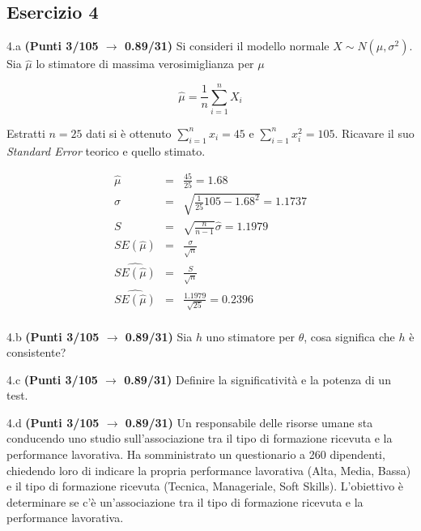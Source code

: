 \documentclass[
  11pt,
]{book}
\theoremstyle{mytheoremstyle}
\theoremstyle{mydefstyle}
\newenvironment{sol}
  {
  \begin{tcolorbox}[enhanced,breakable,arc=0.1mm,boxrule=1pt,colback=white,colframe=iblue,
  title=\bf \fontfamily{lmss}\selectfont \hspace{.5 cm} Soluzione,drop fuzzy shadow]

}{
\end{tcolorbox}
  }
\begin{document}
\subsection{Esercizio 4}\label{esercizio-4-39}

4.a \textbf{(Punti 3/105 \(\rightarrow\) 0.89/31)} Si consideri il modello normale \(X\sim N(\mu,\sigma^2)\). Sia \(\hat\mu\) lo stimatore di massima verosimiglianza per \(\mu\)

\[
  \hat\mu = \frac 1n \sum_{i=1}^n X_i
\]

Estratti \(n=25\) dati si è ottenuto \(\sum_{i=1}^n x_i = 45\) e \(\sum_{i=1}^n x_i^2 = 105\). Ricavare il suo \emph{Standard Error} teorico e quello stimato.

\begin{sol}
\begin{eqnarray*}
  \hat\mu  &=&\frac{45}{25}=1.68\\
  \hat\sigma &=&\sqrt{\frac 1{25}105-1.68^2}=1.1737\\
  S &=&\sqrt{\frac{n}{n-1}}\hat\sigma=1.1979\\
  SE(\hat\mu) &=&  \frac{\sigma}{\sqrt{n}}\\
  \widehat{SE(\hat\mu)} &=& \frac{S}{\sqrt{n}}\\
  \widehat{SE(\hat\mu)} &=& \frac{1.1979}{\sqrt{25}}=0.2396\\
\end{eqnarray*}

\end{sol}

4.b \textbf{(Punti 3/105 \(\rightarrow\) 0.89/31)} Sia \(h\) uno stimatore per \(\theta\), cosa significa che \(h\) è consistente?

4.c \textbf{(Punti 3/105 \(\rightarrow\) 0.89/31)} Definire la significatività e la potenza di un test.

4.d \textbf{(Punti 3/105 \(\rightarrow\) 0.89/31)} Un responsabile delle risorse umane sta conducendo uno studio sull'associazione tra il tipo di formazione ricevuta e la performance lavorativa. Ha somministrato un questionario a 260 dipendenti, chiedendo loro di indicare la propria performance lavorativa (Alta, Media, Bassa) e il tipo di formazione ricevuta (Tecnica, Manageriale, Soft Skills). L'obiettivo è determinare se c'è un'associazione tra il tipo di formazione ricevuta e la performance lavorativa.
\end{document}

